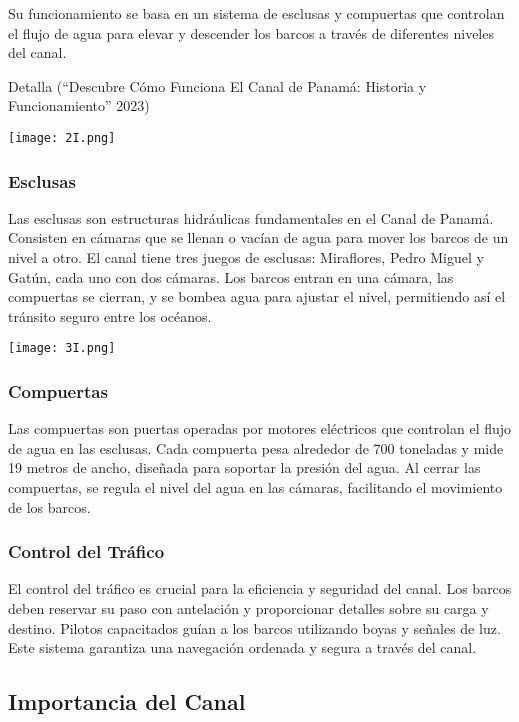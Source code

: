 \documentclass{article}
\begin{document}
Su funcionamiento se basa en un sistema de esclusas y compuertas que
controlan el flujo de agua para elevar y descender los barcos a través
de diferentes niveles del canal.

Detalla ({``Descubre {Cómo} {Funciona} El {Canal} de {Panamá}:
{Historia} y {Funcionamiento}''} 2023)

\texttt{[image: 2I.png]}

\hypertarget{esclusas}{%
\subsubsection{Esclusas}\label{esclusas}}

Las esclusas son estructuras hidráulicas fundamentales en el Canal de
Panamá. Consisten en cámaras que se llenan o vacían de agua para mover
los barcos de un nivel a otro. El canal tiene tres juegos de esclusas:
Miraflores, Pedro Miguel y Gatún, cada uno con dos cámaras. Los barcos
entran en una cámara, las compuertas se cierran, y se bombea agua para
ajustar el nivel, permitiendo así el tránsito seguro entre los océanos.

\texttt{[image: 3I.png]}

\hypertarget{compuertas}{%
\subsubsection{Compuertas}\label{compuertas}}

Las compuertas son puertas operadas por motores eléctricos que controlan
el flujo de agua en las esclusas. Cada compuerta pesa alrededor de 700
toneladas y mide 19 metros de ancho, diseñada para soportar la presión
del agua. Al cerrar las compuertas, se regula el nivel del agua en las
cámaras, facilitando el movimiento de los barcos.

\hypertarget{control-del-truxe1fico}{%
\subsubsection{Control del Tráfico}\label{control-del-truxe1fico}}

El control del tráfico es crucial para la eficiencia y seguridad del
canal. Los barcos deben reservar su paso con antelación y proporcionar
detalles sobre su carga y destino. Pilotos capacitados guían a los
barcos utilizando boyas y señales de luz. Este sistema garantiza una
navegación ordenada y segura a través del canal.

\hypertarget{importancia-del-canal}{%
\subsection{Importancia del Canal}\label{importancia-del-canal}}
\end{document}
